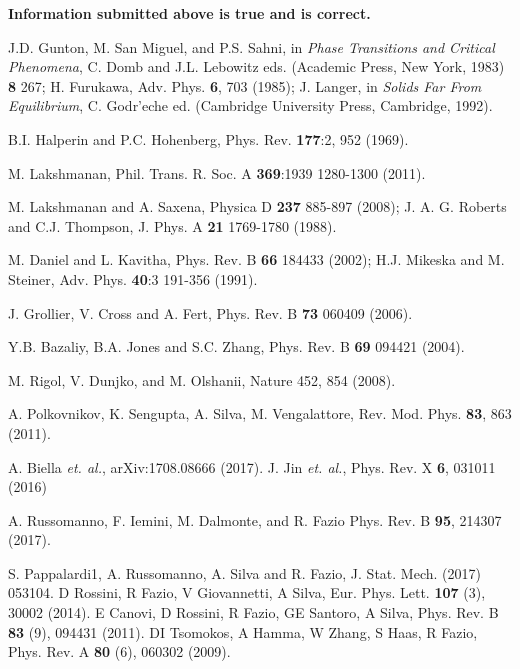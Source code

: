 \documentclass[a4paper,11pt,color]{article}
\renewenvironment{thebibliography}[1]{%
    \begin{oldthebibliography}{#1}%
      \setlength{\parskip}{0ex}%
      \setlength{\itemsep}{0ex}%
  }%
  {%
    \end{oldthebibliography}%
  }
\begin{document}
\begin{center}
\textbf{Information submitted above is true and is correct.}
\end{center}

\newpage


\nocite{*}

\begin{thebibliography}{}

J.D. Gunton, M. San Miguel, and P.S. Sahni, in \textit{Phase Transitions and Critical Phenomena}, C. Domb
and J.L. Lebowitz eds. (Academic Press, New York, 1983)  {\bf 8} 267; H. Furukawa, Adv. Phys. {\bf 6}, 703 (1985);
J. Langer, in \textit{Solids Far From Equilibrium}, C. Godr'eche ed. (Cambridge University Press, Cambridge, 1992).

B.I. Halperin and P.C. Hohenberg, Phys. Rev. {\bf 177}:2, 952 (1969).

M. Lakshmanan,  Phil. Trans. R. Soc. A {\bf 369}:1939 1280-1300 (2011).

M. Lakshmanan and A. Saxena, Physica D {\bf 237} 885-897 (2008); J. A. G. Roberts and C.J. Thompson, J. Phys. A {\bf 21} 1769-1780 (1988).

M. Daniel and L. Kavitha, Phys. Rev. B {\bf 66} 184433 (2002); H.J. Mikeska and M. Steiner, Adv. Phys. {\bf40}:3 191-356 (1991). 

J. Grollier, V. Cross  and A. Fert, Phys. Rev. B {\bf 73} 060409 (2006).

Y.B. Bazaliy, B.A. Jones and S.C. Zhang, Phys. Rev. B {\bf 69} 094421 (2004).

M. Rigol, V. Dunjko, and M. Olshanii, Nature 452, 854 (2008).

A. Polkovnikov, K. Sengupta, A. Silva, M. Vengalattore, Rev. Mod. Phys. \textbf{83}, 863 (2011).

A. Biella \textit{et. al.}, arXiv:1708.08666 (2017).
J. Jin \textit{et. al.}, Phys. Rev. X {\bf 6}, 031011 (2016)

A. Russomanno, F. Iemini, M. Dalmonte, and R. Fazio
Phys. Rev. B {\bf 95}, 214307 (2017). 

S. Pappalardi1, A. Russomanno, A. Silva and R. Fazio, J. Stat. Mech. (2017) 053104. D Rossini, R Fazio, V Giovannetti, A Silva, Eur. Phys. Lett. {\bf 107} (3), 30002 (2014). E Canovi, D Rossini, R Fazio, GE Santoro, A Silva, Phys. Rev. B {\bf 83} (9), 094431 (2011). DI Tsomokos, A Hamma, W Zhang, S Haas, R Fazio, Phys. Rev. A {\bf 80} (6), 060302 (2009).


\end{thebibliography}
\end{document}
